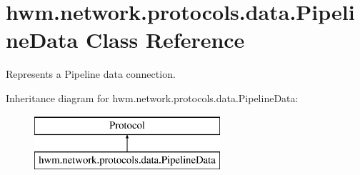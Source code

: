 \hypertarget{classhwm_1_1network_1_1protocols_1_1data_1_1_pipeline_data}{\section{hwm.\-network.\-protocols.\-data.\-Pipeline\-Data Class Reference}
\label{classhwm_1_1network_1_1protocols_1_1data_1_1_pipeline_data}
}


Represents a Pipeline data connection.  


Inheritance diagram for hwm.\-network.\-protocols.\-data.\-Pipeline\-Data\-:\begin{figure}[H]
\begin{center}
\leavevmode
\includegraphics[height=2.000000cm]{classhwm_1_1network_1_1protocols_1_1data_1_1_pipeline_data}
\end{center}
\end{figure}
